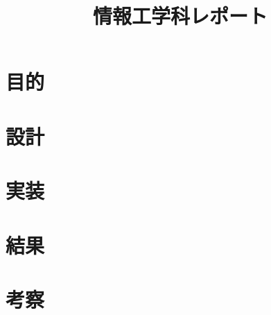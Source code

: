 \documentclass[a4paper]{jsarticle}
\title{情報工学科レポート}
\author{}
\begin{document}
\maketitle
\thispagestyle{empty}
\section{目的}


\section{設計}


\section{実装}


\section{結果}


\section{考察}


\end{document}
